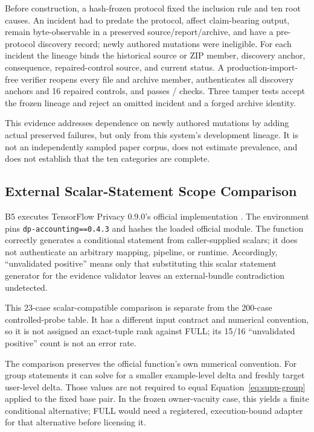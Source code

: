 \documentclass[letterpaper]{article} %
\begin{document}
Before construction, a hash-frozen protocol fixed the inclusion rule and ten
root causes.  An incident had to predate the protocol, affect claim-bearing
output, remain byte-observable in a preserved source/report/archive, and have
a pre-protocol discovery record; newly authored mutations were ineligible.
For each incident the lineage binds the historical source or ZIP member,
discovery anchor, consequence, repaired-control source, and current status.
A production-import-free verifier reopens every file and archive member,
authenticates all discovery anchors and 16 repaired controls, and passes
\AuditRetrospectiveCheckCount/\AuditRetrospectiveCheckCount{} checks.  Three
tamper tests accept the frozen lineage and reject an omitted incident and a
forged archive identity.

This evidence addresses dependence on newly authored mutations by adding
actual preserved failures, but only from this system's development lineage.
It is not an independently sampled paper corpus, does not estimate
prevalence, and does not establish that the ten categories are complete.

\subsection{External Scalar-Statement Scope Comparison}

B5 executes TensorFlow Privacy 0.9.0's official
 implementation
\citep{tensorflowprivacystatement}.  The environment pins
\texttt{dp-accounting==0.4.3} \citep{dpaccounting043} and hashes the loaded official module.  The
function correctly generates a conditional statement from caller-supplied
scalars; it does not authenticate an arbitrary mapping, pipeline, or runtime.
Accordingly, ``unvalidated positive'' means only that substituting this scalar
statement generator for the evidence validator leaves an external-bundle
contradiction undetected.

This 23-case scalar-compatible comparison is separate from the 200-case
controlled-probe table.  It has a different input contract and numerical
convention, so it is not assigned an exact-tuple rank against FULL; its
15/16 ``unvalidated positive'' count is not an error rate.

The comparison preserves the official function's own numerical convention.
For group statements it can solve for a smaller example-level delta and
freshly target user-level delta.  Those values are not required to equal
Equation~\eqref{eq:supp-group} applied to the fixed base pair.  In the frozen
owner-vacuity case, this yields a finite conditional alternative; FULL would
need a registered, execution-bound adapter for that alternative before
licensing it.
\end{document}
